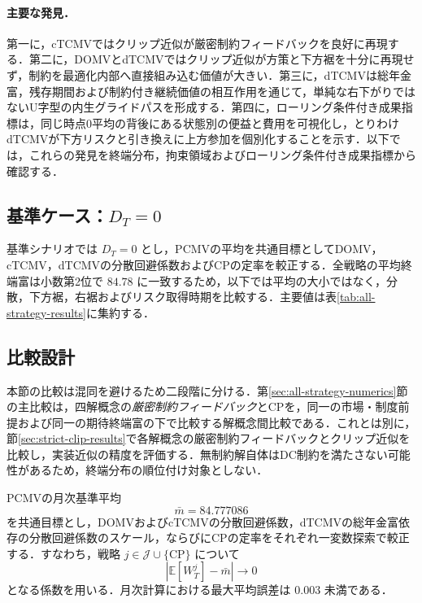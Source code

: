 \documentclass[10pt,a4paper]{article}
\theoremstyle{plain}
\theoremstyle{definition}
\newcommand{\E}{\mathbb{E}}
\begin{document}
\paragraph{主要な発見．}
第一に，cTCMVではクリップ近似が厳密制約フィードバックを良好に再現する．第二に，DOMVとdTCMVではクリップ近似が方策と下方裾を十分に再現せず，制約を最適化内部へ直接組み込む価値が大きい．第三に，dTCMVは総年金富，残存期間および制約付き継続価値の相互作用を通じて，単純な右下がりではないU字型の内生グライドパスを形成する．第四に，ローリング条件付き成果指標は，同じ時点0平均の背後にある状態別の便益と費用を可視化し，とりわけdTCMVが下方リスクと引き換えに上方参加を個別化することを示す．以下では，これらの発見を終端分布，拘束領域およびローリング条件付き成果指標から確認する．

\subsection{基準ケース：\texorpdfstring{$D_T=0$}{DT=0}}

基準シナリオでは $D_T=0$ とし，PCMVの平均を共通目標としてDOMV，cTCMV，dTCMVの分散回避係数およびCPの定率を較正する．全戦略の平均終端富は小数第2位で $84.78$ に一致するため，以下では平均の大小ではなく，分散，下方裾，右裾およびリスク取得時期を比較する．主要値は表\ref{tab:all-strategy-results}に集約する．

\subsection{比較設計}

本節の比較は混同を避けるため二段階に分ける．第\ref{sec:all-strategy-numerics}節の主比較は，四解概念の\emph{厳密制約フィードバック}とCPを，同一の市場・制度前提および同一の期待終端富の下で比較する解概念間比較である．これとは別に，節\ref{sec:strict-clip-results}で各解概念の厳密制約フィードバックとクリップ近似を比較し，実装近似の精度を評価する．無制約解自体はDC制約を満たさない可能性があるため，終端分布の順位付け対象としない．

PCMVの月次基準平均
\[
  \bar m=84.777086
\]
を共通目標とし，DOMVおよびcTCMVの分散回避係数，dTCMVの総年金富依存の分散回避係数のスケール，ならびにCPの定率をそれぞれ一変数探索で較正する．すなわち，戦略 $j\in\mathcal J\cup\{\mathrm{CP}\}$ について
\begin{equation}
  \left|\E[W_T^{j}]-\bar m\right|\longrightarrow 0
  \label{eq:equal-mean-calibration}
\end{equation}
となる係数を用いる．月次計算における最大平均誤差は $0.003$ 未満である．
\end{document}

